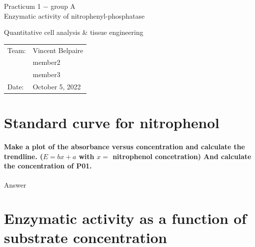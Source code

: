 \documentclass[a4paper,12pt]{article}
\begin{document}
\centering
\onecolumn

\noindent
\begin{minipage}[]{0.7\textwidth}
\large{Practicum 1 $-$ group A \\Enzymatic activity of nitrophenyl-phosphatase}\par \vspace{0.1em}
\footnotesize{Quantitative cell analysis \& tissue engineering}\vspace{0.6em}
\flushleft
\begin{tabularx}{}{X l}
Team:  & Vincent Belpaire\\
& member2 \\
& member3 \\
Date: & October 5, 2022
\end{tabularx}


\end{minipage}%
\begin{minipage}[]{0.3\textwidth}
\end{minipage}

\flushleft

\section{Standard curve for nitrophenol}

\paragraph{Make a plot of the absorbance versus concentration and calculate the trendline. ($E=bx+a$ with $x=$ nitrophenol concetration) And calculate the concentration of P01.}

Answer\\

\section{Enzymatic activity as a function of substrate concentration}
\end{document}
